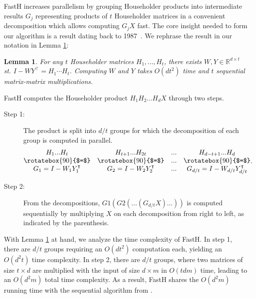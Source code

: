 \documentclass[11pt,a4paper,twoside,openright,final]{memoir}
\newtheorem{lemma}{Lemma}
\begin{document}
FastH increases parallelism by grouping Householder products into intermediate results $G_j$ representing products of $t$ Householder matrices in a convenient decomposition which allows computing $G_jX$ fast. 
The core insight needed to form our algorithm is a result dating back to 1987~\cite{wydec}.
We rephrase the result in our notation in Lemma \ref{lem:wydec}:

\begin{lemma}\label{lem:wydec}
For any $t$ Householder matrices $H_1,...,H_t$, there exists $W,Y\in \mathbb{R}^{d\times t}$ st. 
$I-WY^\intercal = H_1 \cdots H_t$. 
Computing $W$ and $Y$ takes $O(dt^2)$ time and $t$ sequential matrix-matrix multiplications. 
\end{lemma}

FastH computes the Householder product $H_1H_2...H_dX$ through two steps.

\begin{description}
\item[Step 1:] The product is split into $d/t$ groups for which the decomposition of each group is computed in parallel.
\newcommand{\veq}{\mathrel{\rotatebox{90}{$=$}}}
\begin{equation}
    \begin{matrix}
        H_1...H_t & H_{t+1}...H_{2t} & ... & H_{d-t+1}...H_d \\
        \veq  & \veq & ... & \veq\\
        G_1 = I -W_1Y_1^\intercal & G_2 = I - W_2Y_2^\intercal & ... & G_{d/t} = I - W_{d/t}Y_{d/t}^\intercal
    \end{matrix}.
\end{equation}
\item[Step 2:] From the decompositions, $G1(G2(...(G_{d/t}X)...))$ is computed sequentially by multiplying $X$ on each decomposition from right to left, as indicated by the parenthesis.
\end{description}

With Lemma \ref{lem:wydec} at hand, we analyze the time complexity of FastH.
In step 1, there are $d/t$ groups requiring an $O(dt^2)$ computation each, yielding an $O(d^2t)$ time complexity.
In step 2, there are $d/t$ groups, where two matrices of size $t\times d$ are multiplied with the input of size $d \times m$ in $O(tdm)$ time, leading to an $O(d^2m)$ total time complexity.
As a result, FastH shares the $O(d^2m)$ running time with the sequential algorithm from \cite{sequential}.
\end{document}
